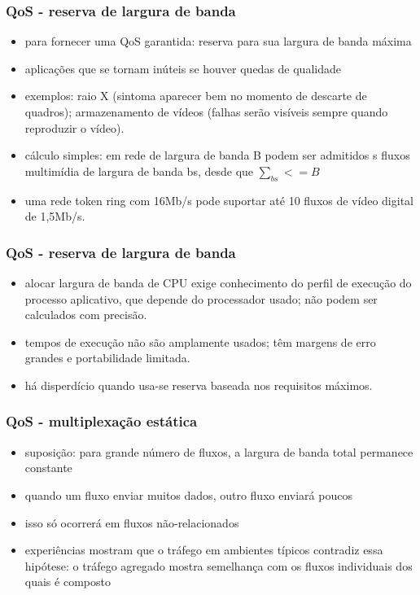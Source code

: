 \documentclass[]{beamer}
\begin{document}
\begin{frame}
  \frametitle{QoS - reserva de largura de banda}
\begin{itemize}
  \item para fornecer uma QoS garantida: reserva para sua largura de banda máxima
  \item aplicações que se tornam inúteis se houver quedas de qualidade
  \item exemplos: raio X (sintoma aparecer bem no momento de descarte de quadros); 
armazenamento de vídeos (falhas serão visíveis sempre quando reproduzir o vídeo).
  \item cálculo simples: em rede de largura de banda B podem ser admitidos s fluxos
multimídia de largura de banda bs, desde que $\sum_{bs} <= B$
  \item uma rede token ring com 16Mb/s pode suportar até 10 fluxos de vídeo digital de
1,5Mb/s.
\end{itemize}
\end{frame}


\begin{frame}
  \frametitle{QoS - reserva de largura de banda}
\begin{itemize}
  \item alocar largura de banda de CPU exige conhecimento do perfil de execução do processo
aplicativo, que depende do processador usado; não podem ser calculados com precisão.
  \item tempos de execução não são amplamente usados; têm margens de erro grandes e 
portabilidade limitada.
  \item há disperdício quando usa-se reserva baseada nos requisitos máximos.
\end{itemize}
\end{frame}

\begin{frame}
  \frametitle{QoS - multiplexação estática}
\begin{itemize}
  \item suposição: para grande número de fluxos, a largura de banda total
permanece constante
  \item quando um fluxo enviar muitos dados, outro fluxo enviará poucos
  \item isso só ocorrerá em fluxos não-relacionados
  \item experiências mostram que o tráfego em ambientes típicos contradiz essa hipótese:
o tráfego agregado mostra semelhança com os fluxos individuais dos quais é composto
\end{itemize}
\end{frame}
\end{document}
